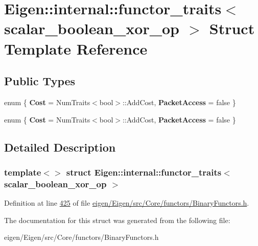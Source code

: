 \hypertarget{struct_eigen_1_1internal_1_1functor__traits_3_01scalar__boolean__xor__op_01_4}{}\section{Eigen\+:\+:internal\+:\+:functor\+\_\+traits$<$ scalar\+\_\+boolean\+\_\+xor\+\_\+op $>$ Struct Template Reference}
\label{struct_eigen_1_1internal_1_1functor__traits_3_01scalar__boolean__xor__op_01_4}
\subsection*{Public Types}
\begin{DoxyCompactItemize}
\item 
\mbox{\label{struct_eigen_1_1internal_1_1functor__traits_3_01scalar__boolean__xor__op_01_4_a244fdf81b9c7d651099bcc2b1ef43bb7}} 
enum \{ {\bfseries Cost} = Num\+Traits$<$bool$>$\+:\+:Add\+Cost, 
{\bfseries Packet\+Access} = false
 \}
\item 
\mbox{\label{struct_eigen_1_1internal_1_1functor__traits_3_01scalar__boolean__xor__op_01_4_a9c0bd976be14b47e40ab246fc6763209}} 
enum \{ {\bfseries Cost} = Num\+Traits$<$bool$>$\+:\+:Add\+Cost, 
{\bfseries Packet\+Access} = false
 \}
\end{DoxyCompactItemize}


\subsection{Detailed Description}
\subsubsection*{template$<$$>$\newline
struct Eigen\+::internal\+::functor\+\_\+traits$<$ scalar\+\_\+boolean\+\_\+xor\+\_\+op $>$}



Definition at line \hyperlink{eigen_2_eigen_2src_2_core_2functors_2_binary_functors_8h_source_l00425}{425} of file \hyperlink{eigen_2_eigen_2src_2_core_2functors_2_binary_functors_8h_source}{eigen/\+Eigen/src/\+Core/functors/\+Binary\+Functors.\+h}.



The documentation for this struct was generated from the following file\+:\begin{DoxyCompactItemize}
\item 
eigen/\+Eigen/src/\+Core/functors/\+Binary\+Functors.\+h\end{DoxyCompactItemize}
